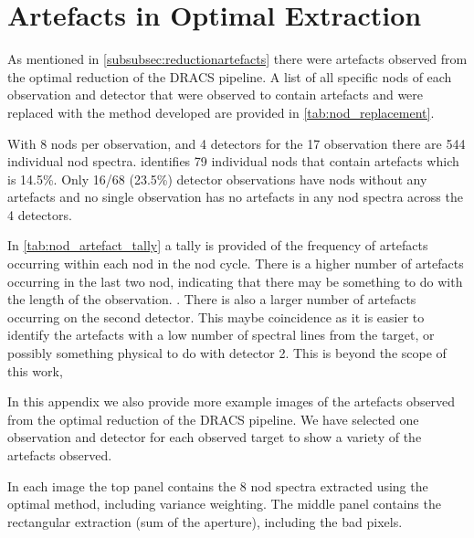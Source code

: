 
\chapter{Artefacts in Optimal Extraction}
\label{appendix:artefacts}





As mentioned in \cref{subsubsec:reductionartefacts} there were artefacts observed from the optimal reduction of the {DRACS} pipeline. A list of all specific nods of each observation and detector that were observed to contain artefacts and were replaced with the method developed are provided in \cref{tab:nod_replacement}.

With 8 nods per observation, and 4 detectors for the 17 observation there are 544 individual nod spectra.  identifies 79 individual nods that contain artefacts which is 14.5\%. Only 16/68 (23.5\%) detector observations have nods without any artefacts and no single observation has no artefacts in any nod spectra across the 4 detectors.

In \cref{tab:nod_artefact_tally} a tally is provided of the frequency of artefacts occurring within each nod in the nod cycle. There is a higher number of artefacts occurring in the last two nod, indicating that there may be something to do with the length of the observation. .
There is also a larger number of artefacts occurring on the second detector. This maybe coincidence as it is easier to identify the artefacts with a low number of spectral lines from the target, or possibly something physical to do with detector 2. This is beyond the scope of this work, 

In this appendix we also provide more example images of the artefacts observed from the optimal reduction of the {DRACS} pipeline. We have selected one observation and detector for each observed target to show a variety of the artefacts observed.

In each image the top panel contains the 8 nod spectra extracted using the optimal method, including variance weighting. The middle panel contains the rectangular extraction (sum of the aperture), including the bad pixels.

